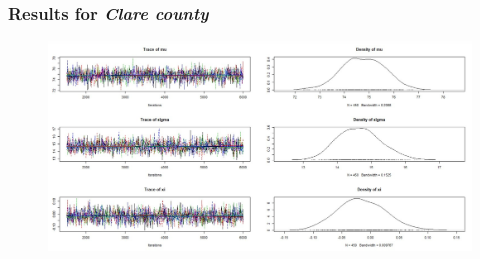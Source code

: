 \documentclass[usenames,dvipsnames]{beamer}
\begin{document}
\begin{frame}
\frametitle{Results for \textit{Clare county }}
\begin{figure}[h!]
 \centering
  \includegraphics[width=1\textwidth]{coda_plots.png}
 \end{figure}
 
\end{frame}
\end{document}
